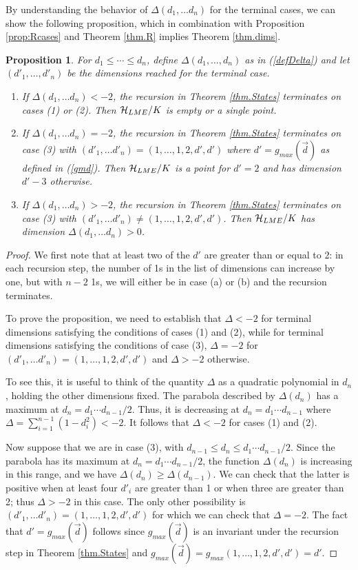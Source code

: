 \documentclass[12pt]{article}
\newtheorem{proposition}[theorem]{Proposition}
\theoremstyle{definition}
\begin{document}
By understanding the behavior of $\Delta(d_1, \dots d_n)$ for the terminal cases, we can show the following proposition, which in combination with Proposition \ref{prop:Rcases} and Theorem \ref{thm.R} implies Theorem \ref{thm.dims}.
\begin{proposition} \label{prop.terminal}
For $d_1 \le \cdots \le d_n$, define $\Delta(d_1, \dots, d_n)$ as in (\ref{defDelta}) and let $(d'_1, \dots, d'_n)$ be the dimensions reached for the terminal case.
\begin{enumerate}
\item
If $\Delta(d_1, \dots d_n) < -2$, the recursion in Theorem \ref{thm.States} terminates on cases (1) or (2). Then ${\cal H}_{LME}/K$ is empty or a single point.
\item
If $\Delta(d_1, \dots d_n) = -2$, the recursion in Theorem \ref{thm.States} terminates on case (3) with $(d'_1, \dots d'_n) = (1,\dots,1,2,d',d')$ where $d' = g_{max}(\vec{d})$ as defined in (\ref{gmd}). Then ${\cal H}_{LME}/K$ is a point for $d'=2$ and has dimension $d'-3$ otherwise.
\item
If $\Delta(d_1, \dots d_n) > -2$, the recursion in Theorem \ref{thm.States} terminates on case (3) with $(d'_1, \dots d'_n) \ne (1,\dots,1,2,d',d')$. Then ${\cal H}_{LME}/K$ has dimension $\Delta(d_1, \dots d_n) > 0$.
\end{enumerate}
\end{proposition}
\begin{proof}
We first note that at least two of the $d'$ are greater than or equal to 2: in each recursion step, the number of 1s in the list of dimensions can increase by one, but with $n-2$ 1s, we will either be in case (a) or (b) and the recursion terminates.

To prove the proposition, we need to establish that $\Delta < -2$ for terminal dimensions satisfying the conditions of cases (1) and (2), while for terminal dimensions satisfying the conditions of case (3), $\Delta = -2$ for $(d'_1, \dots d'_n) = (1,\dots,1,2,d',d')$ and $\Delta > -2$ otherwise.

To see this, it is useful to think of the quantity $\Delta$ as a quadratic polynomial in $d_n$, holding the other dimensions fixed. The parabola described by $\Delta(d_n)$ has a maximum at $d_n = d_1 \cdots d_{n-1}/2$. Thus, it is decreasing at $d_n = d_1 \cdots d_{n-1}$ where $\Delta = \sum_{i=1}^{n-1} (1 - d_i^2) < -2$. It follows that $\Delta < -2$ for cases (1) and (2).

Now suppose that we are in case (3), with $d_{n-1} \le d_n \le d_1 \cdots d_{n-1}/2$. Since the parabola has its maximum at $d_n = d_1 \cdots d_{n-1}/2$, the function $\Delta(d_n)$ is increasing in this range, and we have $\Delta(d_n) \ge \Delta(d_{n-1})$. We can check that the latter is positive when at least four $d'_i$ are greater than 1 or when three are greater than 2; thus $\Delta > -2$ in this case. The only other possibility is $(d'_1, \dots d'_n) = (1,\dots,1,2,d',d')$ for which we can check that $\Delta = -2$. The fact that $d' = g_{max}(\vec{d})$ follows since $g_{max}(\vec{d})$ is an invariant under the recursion step in Theorem \ref{thm.States} and $g_{max}(\vec{d}) = g_{max}(1,\dots,1,2,d',d') = d'$.
\end{proof}
\end{document}
